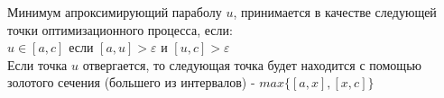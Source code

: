 \documentclass[fleqn]{article}
\begin{document}
Минимум апроксимирующий параболу $u$, принимается в качестве следующей точки оптимизационного процесса, если:\\

$u\in[a,c]$ если $[a,u]>\varepsilon$ и $[u,c]>\varepsilon$\\

Если точка $u$ отвергается, то следующая точка будет находится с помощью золотого сечения (большего из интервалов) - $max\{[a,x],[x,c]\}$\\
\end{document}
